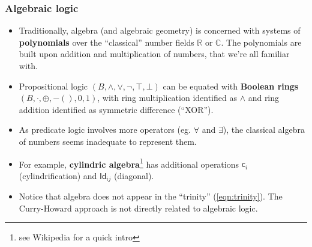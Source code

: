 \documentclass[16pt]{beamer}
\begin{document}
\begin{frame}
\frametitle{Algebraic logic}
\begin{itemize}
	\item Traditionally, algebra (and algebraic geometry) is concerned with systems of \textbf{polynomials} over the ``classical'' number fields $\mathbb{R}$ or $\mathbb{C}$.  The polynomials are built upon addition and multiplication of numbers, that we're all familiar with.
	\item Propositional logic $(B, \wedge, \vee, \neg, \top, \bot)$ can be equated with \textbf{Boolean rings} $(B, \cdot, \oplus, -(), 0, 1)$, with ring multiplication identified as $\wedge$ and ring addition identified as symmetric difference (``XOR'').
	\item As predicate logic involves more operators (eg. $\forall$ and $\exists$), the classical algebra of numbers seems inadequate to represent them.
	\item For example, \textbf{cylindric algebra}\footnote{see Wikipedia for a quick intro} has additional operations $\mathsf{c}_i$ (cylindrification) and $\mathsf{Id}_{ij}$ (diagonal).
	\item Notice that algebra does not appear in the ``trinity'' (\ref{eqn:trinity}).  The Curry-Howard approach is not directly related to algebraic logic.
\end{itemize}
\end{frame}
\end{document}
